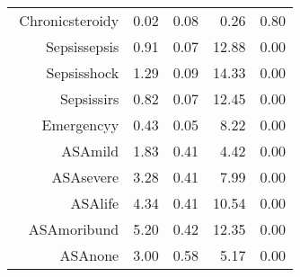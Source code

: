 \begin{tabular}{rrrrr}
$$  Chronic\-steroid\-y & 0.02 & 0.08 & 0.26 & 0.80 \\ 
  Sepsis\-sepsis & 0.91 & 0.07 & 12.88 & 0.00 \\ 
  Sepsis\-shock & 1.29 & 0.09 & 14.33 & 0.00 \\ 
  Sepsis\-sirs & 0.82 & 0.07 & 12.45 & 0.00 \\ 
  Emergency\-y & 0.43 & 0.05 & 8.22 & 0.00 \\ 
  ASA\-mild & 1.83 & 0.41 & 4.42 & 0.00 \\ 
  ASA\-severe & 3.28 & 0.41 & 7.99 & 0.00 \\ 
  ASA\-life & 4.34 & 0.41 & 10.54 & 0.00 \\ 
  ASA\-moribund & 5.20 & 0.42 & 12.35 & 0.00 \\ 
  ASA\-none & 3.00 & 0.58 & 5.17 & 0.00 \\ 
   \hline
\end{tabular}

